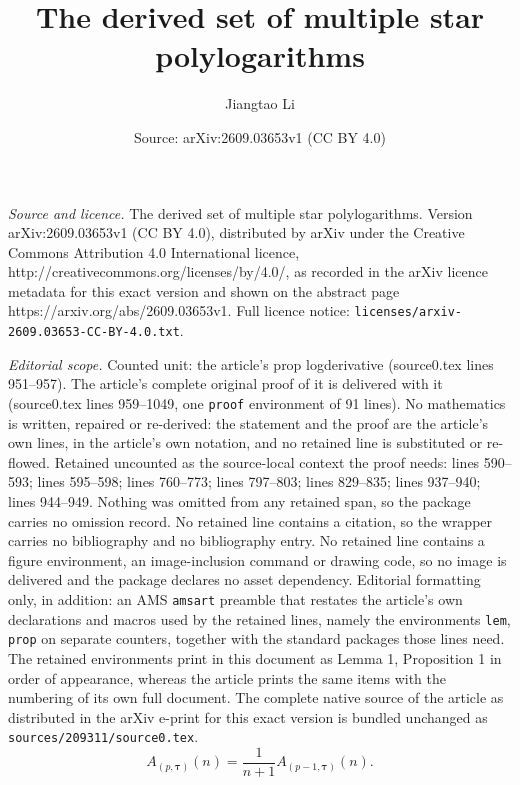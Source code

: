 \documentclass[10pt,a4paper]{amsart}
\title{The derived set of multiple star polylogarithms}
\author{Jiangtao Li}
\date{Source: arXiv:2609.03653v1 (CC BY 4.0)}
\begin{document}
\maketitle

\noindent\emph{Source and licence.} The derived set of multiple star polylogarithms. Version arXiv:2609.03653v1 (CC BY 4.0), distributed by arXiv under the Creative Commons Attribution 4.0 International licence, http://creativecommons.org/licenses/by/4.0/, as recorded in the arXiv licence metadata for this exact version and shown on the abstract page https://arxiv.org/abs/2609.03653v1. Full licence notice: \texttt{licenses/arxiv-2609.03653-CC-BY-4.0.txt}.\par\smallskip

\noindent\textit{Editorial scope.} Counted unit: the article's prop logderivative (source0.tex lines 951--957). The article's complete original proof of it is delivered with it (source0.tex lines 959--1049, one \texttt{proof} environment of 91 lines). No mathematics is written, repaired or re-derived: the statement and the proof are the article's own lines, in the article's own notation, and no retained line is substituted or re-flowed.  Retained uncounted as the source-local context the proof needs: lines 590--593; lines 595--598; lines 760--773; lines 797--803; lines 829--835; lines 937--940; lines 944--949.  Nothing was omitted from any retained span, so the package carries no omission record.  No retained line contains a citation, so the wrapper carries no bibliography and no bibliography entry.  No retained line contains a figure environment, an image-inclusion command or drawing code, so no image is delivered and the package declares no asset dependency.  Editorial formatting only, in addition: an AMS \texttt{amsart} preamble that restates the article's own declarations and macros used by the retained lines, namely the environments \texttt{lem}, \texttt{prop} on separate counters, together with the standard packages those lines need.  The retained environments print in this document as Lemma 1, Proposition 1 in order of appearance, whereas the article prints the same items with the numbering of its own full document.  The complete native source of the article as distributed in the arXiv e-print for this exact version is bundled unchanged as \texttt{sources/209311/source0.tex}.
\begin{equation}\label{ArecM}
A_{(p,{\boldsymbol\tau})}(n)
=\frac1{n+1}A_{(p-1,{\boldsymbol\tau})}(n).
\end{equation}
\end{document}
